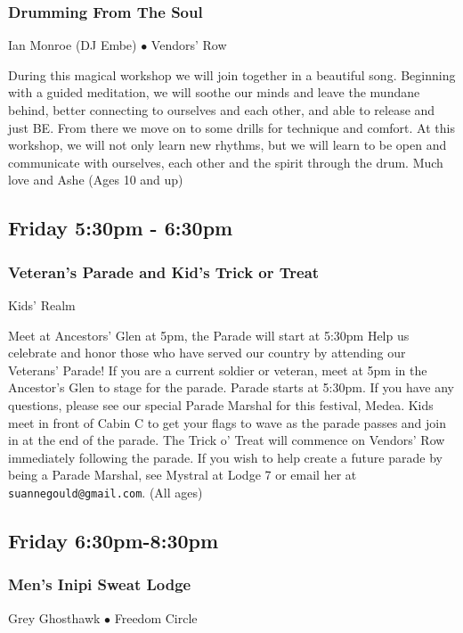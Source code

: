 \subsubsection{Drumming From The Soul}
\label{Fri-Embe1}
{\small Ian Monroe (DJ Embe) $\bullet$  Vendors' Row}

 During this magical workshop we will join together in a beautiful song. Beginning with a guided meditation, we will soothe our minds and leave the mundane behind, better connecting to ourselves and each other, and able to release and just BE. From there we move on to some drills for technique and comfort.  At this workshop, we will not only learn new rhythms, but we will learn to be open and communicate with ourselves, each other and the spirit through the drum. Much love and Ashe {\small (Ages 10 and up)}

\subsection{Friday 5:30pm - 6:30pm}

\subsubsection{Veteran's Parade and Kid's Trick or Treat}
\label{Fri-Parade}
{\small  Kids' Realm}

 {\footnotesize Meet at Ancestors' Glen at 5pm, the Parade will start at 5:30pm}
Help us celebrate and honor those who have served our country by attending our Veterans' Parade! If you are a current soldier or veteran, meet at 5pm in the Ancestor's Glen to stage for the parade.  Parade starts at 5:30pm.  If you have any questions, please see our special Parade Marshal for this festival, Medea.
Kids meet in front of Cabin C to get your flags to wave as the parade passes and join in at the end of the parade.  The Trick o' Treat will commence on Vendors' Row immediately following the parade.
If you wish to help create a future parade by being a Parade Marshal, see Mystral at Lodge 7 or email her at  \texttt{suannegould@gmail.com}. {\small (All ages)}

\subsection{Friday 6:30pm-8:30pm}

\subsubsection{Men's Inipi Sweat Lodge}
\label{Fri-sweat-men}
{\small Grey Ghosthawk $\bullet$  Freedom Circle}

